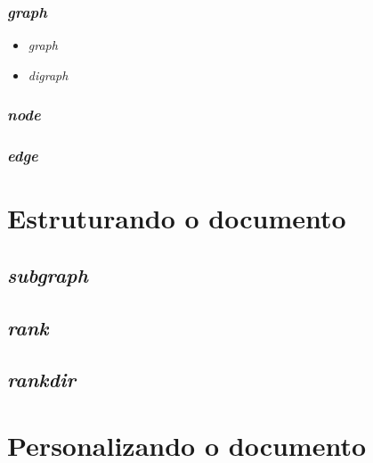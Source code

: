 \documentclass[a4paper,12pt]{article}
\begin{document}
      \subsubsection{\emph{graph}}

        \begin{itemize}

          \item{\emph{graph}}

          \item{\emph{digraph}}

        \end{itemize}

      \subsubsection{\emph{node}}

      \subsubsection{\emph{edge}}


  \section{Estruturando o documento}

    \subsection{\emph{subgraph}}

    \subsection{\emph{rank}}

    \subsection{\emph{rankdir}}
    \break

  \section{Personalizando o documento}
\end{document}
